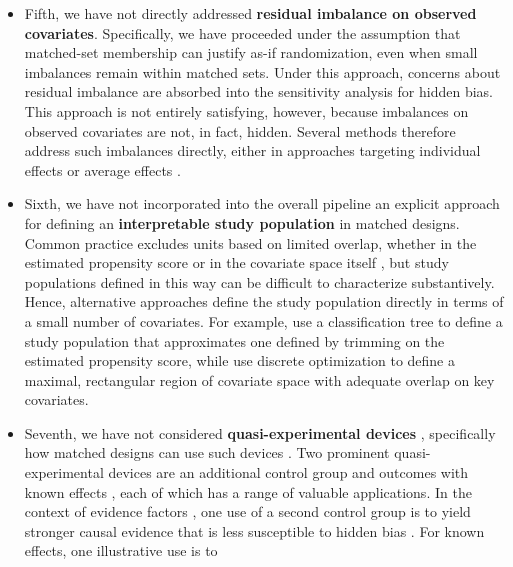 \documentclass[
  12pt,
  leqno]{article}
\begin{document}
\begin{itemize}
  including subsequent contributions by
  \citet{gagnon-bartschshem-tov2019} and \citet{branson2021}, as well as
  related approaches based on the stepwise intersection--union principle
  \citep{hansensales2015}.
\item
  Fifth, we have not directly addressed \textbf{residual imbalance on
  observed covariates}. Specifically, we have proceeded under the
  assumption that matched-set membership can justify as-if
  randomization, even when small imbalances remain within matched sets.
  Under this approach, concerns about residual imbalance are absorbed
  into the sensitivity analysis for hidden bias. This approach is not
  entirely satisfying, however, because imbalances on observed
  covariates are not, in fact, hidden. Several methods therefore address
  such imbalances directly, either in approaches targeting individual
  effects
  \citep{rosenbaum1988, pimentelhuang2024, chenetal2023, hengetal2025}
  or average effects \citep{zhuetal2025}.
\item
  Sixth, we have not incorporated into the overall pipeline an explicit
  approach for defining an \textbf{interpretable study population} in
  matched designs. Common practice excludes units based on limited
  overlap, whether in the estimated propensity score
  \citep{crumpetal2009} or in the covariate space itself
  \citep{kingzeng2006}, but study populations defined in this way can be
  difficult to characterize substantively. Hence, alternative approaches
  define the study population directly in terms of a small number of
  covariates. For example, \citet{traskinsmall2011} use a classification
  tree to define a study population that approximates one defined by
  trimming on the estimated propensity score, while
  \citet{fogartyetal2016} use discrete optimization to define a maximal,
  rectangular region of covariate space with adequate overlap on key
  covariates.
\item
  Seventh, we have not considered \textbf{quasi-experimental devices}
  \citep{campbell1957, campbellstanley1963, shadishetal2002},
  specifically how matched designs can use such devices \citep[see][Part
  IV]{rosenbaum2025}. Two prominent quasi-experimental devices are an
  additional control group \citep{rosenbaum1987b} and outcomes with
  known effects \citep{rosenbaum1989}, each of which has a range of
  valuable applications. In the context of evidence factors
  \citep{rosenbaum2021}, one use of a second control group is to yield
  stronger causal evidence that is less susceptible to hidden bias
  \citep{rosenbaum2023b}. For known effects, one illustrative use is to

\end{itemize}
\end{document}
